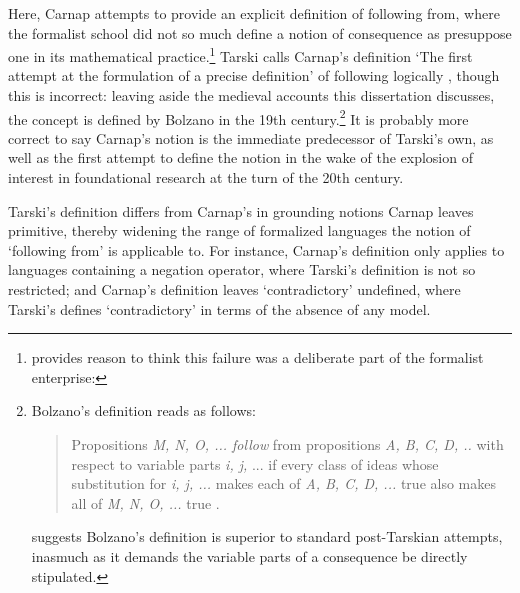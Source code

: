 \documentclass[]{article}
\begin{document}
Here, Carnap attempts to provide an explicit definition of following from, where the formalist school did not so much define a notion of consequence as presuppose one in its mathematical practice.\footnote{\cite[15]{Hardy1929} provides reason to think this failure was a deliberate part of the formalist enterprise: } Tarski calls Carnap's definition `The first attempt at the formulation of a precise definition' of following logically \cite[182]{Tarski2002}, though this is incorrect: leaving aside the medieval accounts this dissertation discusses, the concept is defined by Bolzano in the 19th century.\footnote{Bolzano's definition reads as follows: \begin{quote}Propositions \textit{M, N, O, ... follow} from propositions \textit{A, B, C, D, ..} with respect to variable parts \textit{i, j,} ... if every class of ideas whose substitution for \textit{i, j, ...} makes each of \textit{A, B, C, D, ...} true also makes all of \textit{M, N, O, ...} true \cite[209]{Bolzano1972}.\end{quote} \cite{George1986} suggests Bolzano's definition is superior to standard post-Tarskian attempts, inasmuch as it demands the variable parts of a consequence be directly stipulated.} It is probably more correct to say Carnap's notion is the immediate predecessor of Tarski's own, as well as the first attempt to define the notion in the wake of the explosion of interest in foundational research at the turn of the 20th century.

Tarski's definition differs from Carnap's in grounding notions Carnap leaves primitive, thereby widening the range of formalized languages the notion of `following from' is applicable to. For instance, Carnap's definition only applies to languages containing a negation operator, where Tarski's definition is not so restricted; and Carnap's definition leaves `contradictory' undefined, where Tarski's defines `contradictory' in terms of the absence of any model.
\end{document}
